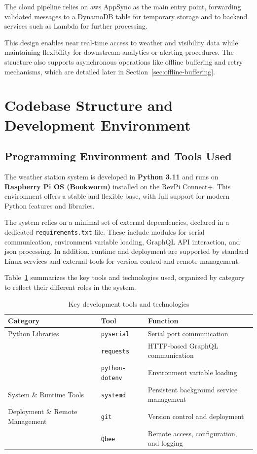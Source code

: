 The cloud pipeline relies on \gls{aws} AppSync as the main entry point, forwarding validated messages to a DynamoDB table for temporary storage and to backend services such as Lambda for further processing.

This design enables near real-time access to weather and visibility data while maintaining flexibility for downstream analytics or alerting procedures. The structure also supports asynchronous operations like offline buffering and retry mechanisms, which are detailed later in Section~\ref{sec:offline-buffering}.

\section{Codebase Structure and Development Environment}
\label{sec:codebase-structure}

\subsection{Programming Environment and Tools Used}

The weather station system is developed in \textbf{Python 3.11} and runs on \textbf{Raspberry Pi OS (Bookworm)} installed on the RevPi Connect+. This environment offers a stable and flexible base, with full support for modern Python features and libraries. 

The system relies on a minimal set of external dependencies, declared in a dedicated \texttt{requirements.txt} file. These include modules for serial communication, environment variable loading, GraphQL API interaction, and \gls{json} processing. In addition, runtime and deployment are supported by standard Linux services and external tools for version control and remote management. 

Table~\ref{tab:tools} summarizes the key tools and technologies used, organized by category to reflect their different roles in the system.


\begin{table}[H]
\centering
\small
\caption{Key development tools and technologies}
\label{tab:tools}
\begin{tabular}{|p{5cm}|p{3cm}|p{7.5cm}|}
\hline
\textbf{Category} & \textbf{Tool} & \textbf{Function} \\
\hline
Python Libraries & \texttt{pyserial} & Serial port communication \\
 & \texttt{requests} & HTTP-based GraphQL communication \\
 & \texttt{python-dotenv} & Environment variable loading \\
\hline
System \& Runtime Tools & \texttt{systemd} & Persistent background service management \\
\hline
Deployment \& Remote Management & \texttt{git} & Version control and deployment \\
 & \texttt{Qbee} & Remote access, configuration, and logging \\
\hline
\end{tabular}
\end{table}


